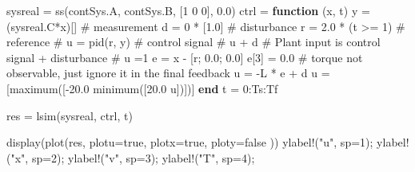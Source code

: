 \documentclass[
  a4paper,
  DIV=11,
  numbers=noendperiod]{scrreprt}
\newenvironment{Shaded}{\begin{snugshade}}{\end{snugshade}}
\newcommand{\CommentTok}[1]{\textcolor[rgb]{0.37,0.37,0.37}{#1}}
\newcommand{\ConstantTok}[1]{\textcolor[rgb]{0.56,0.35,0.01}{#1}}
\newcommand{\FloatTok}[1]{\textcolor[rgb]{0.68,0.00,0.00}{#1}}
\newcommand{\FunctionTok}[1]{\textcolor[rgb]{0.28,0.35,0.67}{#1}}
\newcommand{\KeywordTok}[1]{\textcolor[rgb]{0.00,0.23,0.31}{\textbf{#1}}}
\newcommand{\NormalTok}[1]{\textcolor[rgb]{0.00,0.23,0.31}{#1}}
\newcommand{\OperatorTok}[1]{\textcolor[rgb]{0.37,0.37,0.37}{#1}}
\newcommand{\StringTok}[1]{\textcolor[rgb]{0.13,0.47,0.30}{#1}}
\begin{document}
\begin{Shaded}
\begin{Highlighting}[]
\NormalTok{sysreal }\OperatorTok{=} \FunctionTok{ss}\NormalTok{(contSys.A, contSys.B, [}\FloatTok{1} \FloatTok{0} \FloatTok{0}\NormalTok{], }\FloatTok{0.0}\NormalTok{)}
\NormalTok{ctrl }\OperatorTok{=} \KeywordTok{function}\NormalTok{ (x, t)}
\NormalTok{    y }\OperatorTok{=}\NormalTok{ (sysreal.C}\OperatorTok{*}\NormalTok{x)[] }\CommentTok{\# measurement}
\NormalTok{    d }\OperatorTok{=} \FloatTok{0} \OperatorTok{*}\NormalTok{ [}\FloatTok{1.0}\NormalTok{]        }\CommentTok{\# disturbance}
\NormalTok{    r }\OperatorTok{=} \FloatTok{2.0} \OperatorTok{*}\NormalTok{ (t }\OperatorTok{\textgreater{}=} \FloatTok{1}\NormalTok{) }\CommentTok{\# reference}
    \CommentTok{\# u = pid(r, y) \# control signal}
    \CommentTok{\# u + d \# Plant input is control signal + disturbance}
    \CommentTok{\# u =1}
    \ConstantTok{e} \OperatorTok{=}\NormalTok{ x }\OperatorTok{{-}}\NormalTok{ [r; }\FloatTok{0.0}\NormalTok{; }\FloatTok{0.0}\NormalTok{]}
    \ConstantTok{e}\NormalTok{[}\FloatTok{3}\NormalTok{] }\OperatorTok{=} \FloatTok{0.0} \CommentTok{\# torque not observable, just ignore it in the final feedback}
\NormalTok{    u }\OperatorTok{=} \OperatorTok{{-}}\NormalTok{L }\OperatorTok{*} \ConstantTok{e} \OperatorTok{+}\NormalTok{ d}
\NormalTok{    u }\OperatorTok{=}\NormalTok{ [}\FunctionTok{maximum}\NormalTok{([}\OperatorTok{{-}}\FloatTok{20.0} \FunctionTok{minimum}\NormalTok{([}\FloatTok{20.0}\NormalTok{ u])])]}
\KeywordTok{end}
\NormalTok{t }\OperatorTok{=} \FloatTok{0}\OperatorTok{:}\NormalTok{Ts}\OperatorTok{:}\NormalTok{Tf}

\NormalTok{res }\OperatorTok{=} \FunctionTok{lsim}\NormalTok{(sysreal, ctrl, t)}

\FunctionTok{display}\NormalTok{(}\FunctionTok{plot}\NormalTok{(res, }
\NormalTok{    plotu}\OperatorTok{=}\ConstantTok{true}\NormalTok{, }
\NormalTok{    plotx}\OperatorTok{=}\ConstantTok{true}\NormalTok{, }
\NormalTok{    ploty}\OperatorTok{=}\ConstantTok{false}
\NormalTok{    ))}
\FunctionTok{ylabel!}\NormalTok{(}\StringTok{"u"}\NormalTok{, sp}\OperatorTok{=}\FloatTok{1}\NormalTok{);}
\FunctionTok{ylabel!}\NormalTok{(}\StringTok{"x"}\NormalTok{, sp}\OperatorTok{=}\FloatTok{2}\NormalTok{);}
\FunctionTok{ylabel!}\NormalTok{(}\StringTok{"v"}\NormalTok{, sp}\OperatorTok{=}\FloatTok{3}\NormalTok{);}
\FunctionTok{ylabel!}\NormalTok{(}\StringTok{"T"}\NormalTok{, sp}\OperatorTok{=}\FloatTok{4}\NormalTok{);}
\end{Highlighting}
\end{Shaded}
\end{document}
